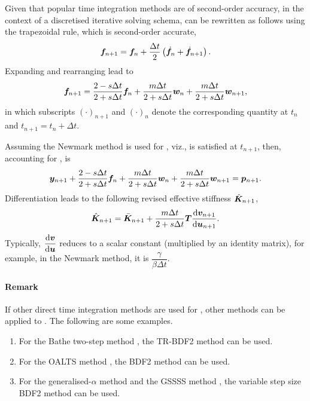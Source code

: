 Given that popular time integration methods are of second-order accuracy, in the context of a discretised iterative solving schema,  can be rewritten as follows using the trapezoidal rule, which is second-order accurate,
\begin{gather}
\bm{f}_{n+1}=\bm{f}_n+\dfrac{\Delta{}t}{2}\left(\dot{\bm{f}}_n+\dot{\bm{f}}_{n+1}\right).
\end{gather}
Expanding and rearranging lead to
\begin{gather}\label{eq:discretised_c}
\bm{f}_{n+1}=\dfrac{2-s\Delta{}t}{2+s\Delta{}t}\bm{f}_n+\dfrac{m\Delta{}t}{2+s\Delta{}t}\bm{w}_n+\dfrac{m\Delta{}t}{2+s\Delta{}t}\bm{w}_{n+1},
\end{gather}
in which subscripts $\left(\cdot\right)_{n+1}$ and $\left(\cdot\right)_n$ denote the corresponding quantity at $t_n$ and $t_{n+1}=t_n+\Delta{}t$.

Assuming the Newmark method is used for , viz.,  is satisfied at $t_{n+1}$, then, accounting for ,  is
\begin{gather}\label{eq:residual}
\bm{y}_{n+1}+\dfrac{2-s\Delta{}t}{2+s\Delta{}t}\bm{f}_n+\dfrac{m\Delta{}t}{2+s\Delta{}t}\bm{w}_n+\dfrac{m\Delta{}t}{2+s\Delta{}t}\bm{w}_{n+1}=\bm{p}_{n+1}.
\end{gather}
Differentiation leads to the following revised effective stiffness $\hat{\bm{K}}_{n+1}$,
\begin{gather}\label{eq:revised_k}
\hat{\bm{K}}_{n+1}=\bar{\bm{K}}_{n+1}+\dfrac{m\Delta{}t}{2+s\Delta{}t}\bm{T}\dfrac{\mathrm{d}\bm{v}_{n+1}}{\mathrm{d}\bm{u}_{n+1}}.
\end{gather}
Typically, $\dfrac{\mathrm{d}\bm{v}}{\mathrm{d}\bm{u}}$ reduces to a scalar constant (multiplied by an identity matrix), for example, in the Newmark method, it is $\dfrac{\gamma}{\beta\Delta{}t}$.
\begin{Objective}
\paragraph{Remark}
If other direct time integration methods are used for , other methods can be applied to . The following are some examples.
\begin{enumerate}
\item For the Bathe two-step method \citep{Noh2019}, the TR-BDF2 method \citep{Bank1985} can be used.
\item For the OALTS method \citep{Zhang2021}, the BDF2 method can be used.
\item For the generalised-$\alpha$ method \citep{Chung1993} and the GSSSS method \citep{Zhou2003}, the variable step size BDF2 method can be used.
\end{enumerate}
\end{Objective}

